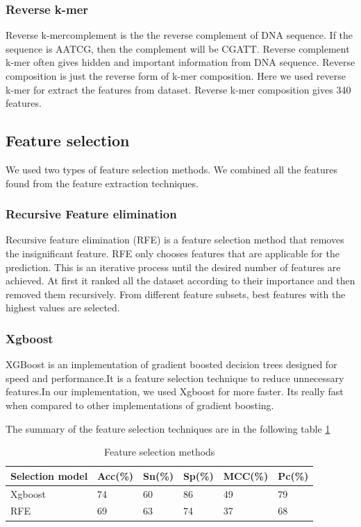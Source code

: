 \documentclass[letterpaper, 10 pt, conference]{ieeeconf}  %
\begin{document}
\subsubsection{Reverse k-mer}
Reverse k-mercomplement is the the reverse complement of DNA sequence. If the sequence is AATCG, then the complement will be CGATT. Reverse complement k-mer often gives hidden and important information from DNA sequence. Reverse composition is just the reverse form of k-mer composition.  Here we used reverse k-mer for extract the features from dataset. Reverse k-mer composition gives 340 features.
\\

\subsection{Feature selection}
We used two types of feature selection methods. We combined all the features found from the feature extraction techniques. 

\subsubsection{Recursive Feature elimination}
Recursive feature elimination (RFE) is a feature selection method that removes the insignificant feature. RFE only chooses features that are applicable for the prediction. This is an iterative process until the desired number of features are achieved. At first it ranked all the dataset according to their importance and then removed them recursively. From different feature subsets, best features with the highest values are selected. 
\\

\subsubsection{Xgboost}
 XGBoost is an implementation of gradient boosted decision trees designed for speed and performance.It is a feature selection technique to reduce unnecessary features.In our implementation, we used Xgboost for more faster. Its really fast when compared to other implementations of gradient boosting.
 
 The summary of the feature selection techniques are in the following table \ref{table_2}
 \begin{table}[ht]
\caption{Feature selection methods}
\label{table_2}
\begin{center}
\begin{tabular}{|p{1cm}|p{1cm}|p{1cm}|p{1cm}|p{1cm}|p{1cm}|}
\hline
Selection model & Acc(\%) & Sn(\%) & Sp(\%) & MCC(\%) & Pc(\%) \\
\hline
Xgboost & 74 & 60 & 86 & 49 & 79\\
\hline
RFE & 69 & 63 & 74 & 37 & 68 \\
\hline

\end{tabular}
\end{center}
\end{table}
\end{document}
